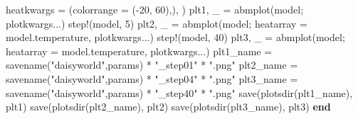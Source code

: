 \documentclass[
  english,
  russian,
  12pt,
  a4paper,
  DIV=11,
  numbers=noendperiod]{scrreprt}
\newenvironment{Shaded}{\begin{snugshade}}{\end{snugshade}}
\newcommand{\ControlFlowTok}[1]{\textcolor[rgb]{0.00,0.23,0.31}{\textbf{#1}}}
\newcommand{\FloatTok}[1]{\textcolor[rgb]{0.68,0.00,0.00}{#1}}
\newcommand{\FunctionTok}[1]{\textcolor[rgb]{0.28,0.35,0.67}{#1}}
\newcommand{\NormalTok}[1]{\textcolor[rgb]{0.00,0.23,0.31}{#1}}
\newcommand{\OperatorTok}[1]{\textcolor[rgb]{0.37,0.37,0.37}{#1}}
\newcommand{\StringTok}[1]{\textcolor[rgb]{0.13,0.47,0.30}{#1}}
\begin{document}
\begin{Shaded}
\begin{Highlighting}[]
\NormalTok{heatkwargs }\OperatorTok{=}\NormalTok{ (colorrange }\OperatorTok{=}\NormalTok{ (}\OperatorTok{{-}}\FloatTok{20}\NormalTok{, }\FloatTok{60}\NormalTok{),),}
\NormalTok{)}
\NormalTok{plt1, \_ }\OperatorTok{=} \FunctionTok{abmplot}\NormalTok{(model; plotkwargs}\OperatorTok{...}\NormalTok{)}
\FunctionTok{step!}\NormalTok{(model, }\FloatTok{5}\NormalTok{)}
\NormalTok{plt2, \_ }\OperatorTok{=} \FunctionTok{abmplot}\NormalTok{(model; heatarray }\OperatorTok{=}\NormalTok{ model.temperature, plotkwargs}\OperatorTok{...}\NormalTok{)}
\FunctionTok{step!}\NormalTok{(model, }\FloatTok{40}\NormalTok{)}
\NormalTok{plt3, \_ }\OperatorTok{=} \FunctionTok{abmplot}\NormalTok{(model; heatarray }\OperatorTok{=}\NormalTok{ model.temperature, plotkwargs}\OperatorTok{...}\NormalTok{)}
\NormalTok{plt1\_name }\OperatorTok{=} \FunctionTok{savename}\NormalTok{(}\StringTok{"daisyworld"}\NormalTok{,params) }\OperatorTok{*} \StringTok{"\_step01"} \OperatorTok{*} \StringTok{".png"}
\NormalTok{plt2\_name }\OperatorTok{=} \FunctionTok{savename}\NormalTok{(}\StringTok{"daisyworld"}\NormalTok{,params) }\OperatorTok{*} \StringTok{"\_step04"} \OperatorTok{*} \StringTok{".png"}
\NormalTok{plt3\_name }\OperatorTok{=} \FunctionTok{savename}\NormalTok{(}\StringTok{"daisyworld"}\NormalTok{,params) }\OperatorTok{*} \StringTok{"\_step40"} \OperatorTok{*} \StringTok{".png"}
\FunctionTok{save}\NormalTok{(}\FunctionTok{plotsdir}\NormalTok{(plt1\_name), plt1)}
\FunctionTok{save}\NormalTok{(}\FunctionTok{plotsdir}\NormalTok{(plt2\_name), plt2)}
\FunctionTok{save}\NormalTok{(}\FunctionTok{plotsdir}\NormalTok{(plt3\_name), plt3)}
\ControlFlowTok{end}
\end{Highlighting}
\end{Shaded}
\end{document}

